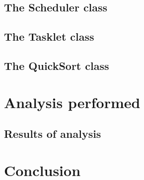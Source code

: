 \documentclass[twocolumn]{article}
\begin{document}
	\subsection{The Scheduler class}
	\subsection{The Tasklet class}
	\subsection{The QuickSort class}
	
	\section{Analysis performed}
	\subsection{Results of analysis}
	
	\section{Conclusion}	
		
	
		
		
		
		
		
	
\end{document}
